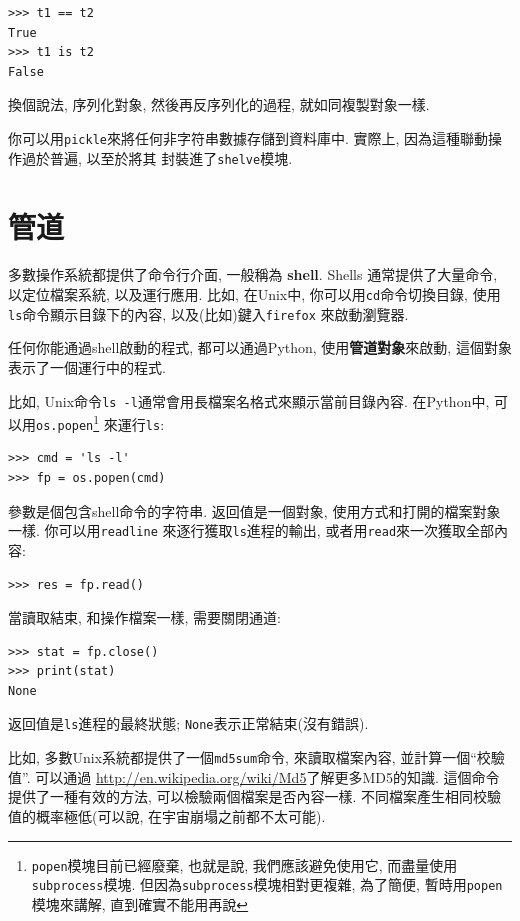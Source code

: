 \documentclass[10pt]{book}
\begin{document}
\begin{verbatim}
>>> t1 == t2
True
>>> t1 is t2
False
\end{verbatim}
%
換個說法, 序列化對象, 然後再反序列化的過程, 就如同複製對象一樣. 

你可以用{\tt pickle}來將任何非字符串數據存儲到資料庫中. 
實際上, 因為這種聯動操作過於普遍, 以至於將其
封裝進了{\tt shelve}模塊.  


\section{管道}

多數操作系統都提供了命令行介面, 一般稱為 {\bf shell}.
Shells 通常提供了大量命令, 以定位檔案系統, 以及運行應用. 
比如, 在Unix中, 你可以用{\tt cd}命令切換目錄, 
使用{\tt ls}命令顯示目錄下的內容, 以及(比如)鍵入{\tt firefox} 來啟動瀏覽器. 

任何你能通過shell啟動的程式, 都可以通過Python, 使用{\bf 管道對象}來啟動, 這個對象表示了一個運行中的程式. 

比如, Unix命令{\tt ls -l}通常會用長檔案名格式來顯示當前目錄內容. 
在Python中, 可以用{\tt os.popen}\footnote{{\tt popen}模塊目前已經廢棄, 
也就是說, 我們應該避免使用它, 而盡量使用{\tt subprocess}模塊. 
但因為{\tt subprocess}模塊相對更複雜, 為了簡便, 
暫時用{\tt popen}模塊來講解, 直到確實不能用再說} 來運行{\tt ls}:

\begin{verbatim}
>>> cmd = 'ls -l'
>>> fp = os.popen(cmd)
\end{verbatim}
%
參數是個包含shell命令的字符串. 
返回值是一個對象, 使用方式和打開的檔案對象一樣. 
你可以用{\tt readline} 來逐行獲取{\tt ls}進程的輸出, 
或者用{\tt read}來一次獲取全部內容:

\begin{verbatim}
>>> res = fp.read()
\end{verbatim}
%
當讀取結束, 和操作檔案一樣, 需要關閉通道:

\begin{verbatim}
>>> stat = fp.close()
>>> print(stat)
None
\end{verbatim}
%
返回值是{\tt ls}進程的最終狀態;
{\tt None}表示正常結束(沒有錯誤).

比如, 多數Unix系統都提供了一個{\tt md5sum}命令, 
來讀取檔案內容, 並計算一個``校驗值''. 
可以通過 \url{http://en.wikipedia.org/wiki/Md5}了解更多MD5的知識. 
這個命令提供了一種有效的方法, 可以檢驗兩個檔案是否內容一樣. 
不同檔案產生相同校驗值的概率極低(可以說, 在宇宙崩塌之前都不太可能). 
\end{document}
